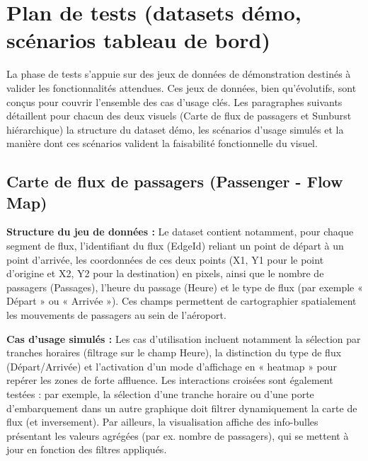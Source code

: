 \section{Plan de tests (datasets démo, scénarios tableau de bord)}
\label{sec:test-plan}

La phase de tests s’appuie sur des jeux de données de démonstration destinés à valider les fonctionnalités attendues. Ces jeux de données, bien qu’évolutifs, sont conçus pour couvrir l’ensemble des cas d’usage clés. Les paragraphes suivants détaillent pour chacun des deux visuels (Carte de flux de passagers et Sunburst hiérarchique) la structure du dataset démo, les scénarios d’usage simulés et la manière dont ces scénarios valident la faisabilité fonctionnelle du visuel.

\subsection{Carte de flux de passagers (Passenger - Flow Map)}
\label{subsec:test-flowmap}

\textbf{Structure du jeu de données :} Le dataset contient notamment, pour chaque segment de flux, l’identifiant du flux (EdgeId) reliant un point de départ à un point d’arrivée, les coordonnées de ces deux points (X1, Y1 pour le point d’origine et X2, Y2 pour la destination) en pixels, ainsi que le nombre de passagers (Passages), l’heure du passage (Heure) et le type de flux (par exemple « Départ » ou « Arrivée »). Ces champs permettent de cartographier spatialement les mouvements de passagers au sein de l’aéroport.

\textbf{Cas d’usage simulés :} Les cas d’utilisation incluent notamment la sélection par tranches horaires (filtrage sur le champ Heure), la distinction du type de flux (Départ/Arrivée) et l’activation d’un mode d’affichage en « heatmap » pour repérer les zones de forte affluence. Les interactions croisées sont également testées : par exemple, la sélection d’une tranche horaire ou d’une porte d’embarquement dans un autre graphique doit filtrer dynamiquement la carte de flux (et inversement). Par ailleurs, la visualisation affiche des info-bulles présentant les valeurs agrégées (par ex. nombre de passagers), qui se mettent à jour en fonction des filtres appliqués.

